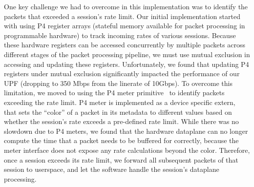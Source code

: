 %
One key challenge we had to overcome in this implementation was to identify the packets that exceeded a session's rate limit. Our initial implementation started with using P4 register arrays (stateful memory available for packet processing in programmable hardware) to track incoming rates of various sessions. Because these hardware registers can be accessed concurrently by multiple packets across different stages of the packet processing pipeline, we must use mutual exclusion in accessing and updating these registers. Unfortunately, we found that updating P4 registers under mutual exclusion significantly impacted the performance of our UPF (dropping to 350 Mbps from the linerate of 10Gbps). To overcome this limitation, we moved to using the P4 meter primitive~\cite{p4nfpmeter, p4bmv2meter} to identify packets exceeding the rate limit. P4 meter is implemented as a device specific extern, that sets the ``color'' of a packet in its metadata to different values based on whether the session's rate exceeds a pre-defined rate limit. While there was no slowdown due to P4 meters, we found that the hardware dataplane can no longer compute the time that a packet needs to be buffered for correctly, because the meter interface does not expose any rate calculations beyond the color. Therefore, once a session exceeds its rate limit, we forward all subsequent packets of that session to userspace, and let the software handle the session's dataplane processing.


